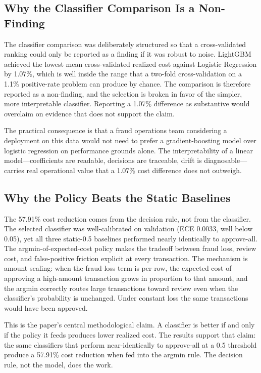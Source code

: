 \documentclass[conference]{IEEEtran}
\begin{document}
\subsection{Why the Classifier Comparison Is a Non-Finding}

The classifier comparison was deliberately structured so that a
cross-validated ranking could only be reported as a finding if it was
robust to noise. LightGBM achieved the lowest mean cross-validated realized
cost against Logistic Regression by 1.07\%, which is well inside the range
that a two-fold cross-validation on a 1.1\% positive-rate problem can
produce by chance. The comparison is therefore reported as a non-finding,
and the selection is broken in favor of the simpler, more interpretable
classifier. Reporting a 1.07\% difference as substantive would overclaim
on evidence that does not support the claim.

The practical consequence is that a fraud operations team considering a
deployment on this data would not need to prefer a gradient-boosting model
over logistic regression on performance grounds alone. The
interpretability of a linear model---coefficients are readable, decisions
are traceable, drift is diagnosable---carries real operational value that
a 1.07\% cost difference does not outweigh.

\subsection{Why the Policy Beats the Static Baselines}

The 57.91\% cost reduction comes from the decision rule, not from the
classifier. The selected classifier was well-calibrated on validation (ECE
0.0033, well below 0.05), yet all three static-0.5 baselines performed
nearly identically to approve-all. The argmin-of-expected-cost policy makes the
tradeoff between fraud loss, review cost, and false-positive friction
explicit at every transaction. The mechanism is amount scaling: when the
fraud-loss term is per-row, the expected cost of approving a high-amount
transaction grows in proportion to that amount, and the argmin correctly
routes large transactions toward review even when the classifier's
probability is unchanged. Under constant loss the same transactions would
have been approved.

This is the paper's central methodological claim. A classifier is better if
and only if the policy it feeds produces lower realized cost. The results
support that claim: the same classifiers that perform near-identically to
approve-all at a 0.5 threshold produce a 57.91\% cost reduction when fed
into the argmin rule. The decision rule, not the model, does the work.
\end{document}
